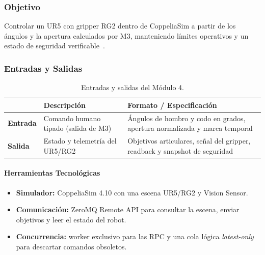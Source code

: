 \subsubsection*{Objetivo}
Controlar un UR5 con gripper RG2 dentro de CoppeliaSim a partir de los
ángulos y la apertura calculados por M3, manteniendo límites operativos y
un estado de seguridad verificable~\cite{Altayeb2023}.

\subsubsection*{Entradas y Salidas}

\begin{table}[h!]
\centering
\renewcommand{\arraystretch}{1.3}
\begin{tabularx}{\textwidth}{
    >{\bfseries}p{3cm}
    X
    X
}    
\toprule
&
\textbf{Descripción} &
\textbf{Formato / Especificación} \\
\midrule
Entrada &
  Comando humano tipado (salida de M3) &
  Ángulos de hombro y codo en grados, apertura normalizada y marca temporal \\
\midrule
Salida &
  Estado y telemetría del UR5/RG2 &
  Objetivos articulares, señal del gripper, readback y snapshot de seguridad \\
\bottomrule
\end{tabularx}
\caption{Entradas y salidas del Módulo 4.}
\label{tab:m4_io}
\end{table}
 
\paragraph{Herramientas Tecnológicas}
\begin{itemize}[leftmargin=1.5em]
  \item \textbf{Simulador:} CoppeliaSim 4.10 con una escena UR5/RG2 y
        Vision Sensor.
  \item \textbf{Comunicación:} ZeroMQ Remote API para consultar la escena,
        enviar objetivos y leer el estado del robot.
  \item \textbf{Concurrencia:} worker exclusivo para las RPC y una cola lógica
        \textit{latest-only} para descartar comandos obsoletos.
\end{itemize}

